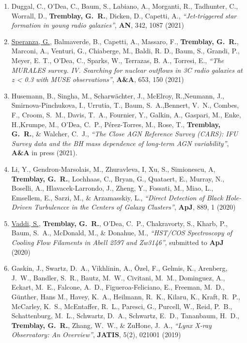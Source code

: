 \documentclass[11pt]{article}
\begin{document}
\begin{enumerate}%


\item Duggal, C., O'Dea, C., Baum, S., Labiano, A., Morganti, R., Tadhunter, C., Worrall, D., \textbf{Tremblay, G.~R.}, Dicken, D., Capetti, A., \textit{``Jet-triggered star formation in young radio galaxies''}, \textbf{AN}, 342, 1087 (2021)

\item \uline{Speranza, G.}, Balmaverde, B., Capetti, A., Massaro, F., \textbf{Tremblay, G.~R.}, Marconi, A., Venturi, G., Chiaberge, M., Baldi, R. D., Baum, S., Grandi, P., Meyer, E. T., O'Dea, C., Sparks, W., Terrazas, B. A., Torresi, E., \textit{``The MURALES survey. IV. Searching for nuclear outflows in 3C radio galaxies at z < 0.3 with MUSE observations''}, \textbf{A\&A}, 653, 150 (2021)

\item Husemann, B., Singha, M., Scharw\"{a}chter, J., McElroy, R.,Neumann, J.,
Smirnova-Pinchukova, I., Urrutia, T., Baum, S.~A.,Bennert, V.~N., Combes, F., Croom, S.~M.,
Davis, T.~A., Fournier, Y., Galkin, A., Gaspari, M., Enke, H.,Krumpe, M., O'Dea, C.~P.,
P\'{e}rez-Torres, M., Rose, T., \textbf{Tremblay, G.~R.}, \& Walcher, C.~J., \textit{``The Close AGN Reference Survey (CARS): IFU Survey data and the BH mass dependence of long-term AGN variability''},
\textbf{A\&A} in press (2021).

\item Li, Y., Gendron-Marsolais, M., Zhuravleva, I, Xu, S.,
Simionescu, A, \textbf{Tremblay, G.~R.}, Lochhaas, C., Bryan, G.,
Quataert, E., Murray, N., Boselli, A., Hlavacek-Larrondo, J.,
Zheng, Y., Fossati, M., Miao, L., Emsellem, E., Sarzi, M.,
\& Arzamasskiy, L., \textit{``Direct Detection of Black Hole-Driven Turbulencce
in the Centers of Galaxy Clusters''}, \textbf{ApJ}, 889, 1 (2020)

\item \uline{Vaddi, S.}, \textbf{Tremblay, G.~R.}, O'Dea, C.~P.,
Chakravorty, S., Kharb, P., Baum, S.~A., McDonald, M., \& Donahue, M.,
\textit{``HST/COS Spectroscopy of Cooling Flow Filaments in Abell 2597 and Zw3146''},
submitted to \textbf{ApJ} (2020)


\item Gaskin, J., Swartz, D.~A., Vikhlinin, A., \"{O}zel, F.,
Gelmis, K., Arenberg, J.~W., Bandler, S.~R., Bautz, M.~W., Civitani, M.~M.,
Dominguez, A., Eckart, M.~E., Falcone, A.~D., Figueroa-Feliciano, E.,
Freeman, M.~D., G\"{u}nther, Hans M., Havey, K.~A., Heilmann, R.~K.,
Kilaru, K., Kraft, R.~P., McCarley, K.~S., McEntaffer, R.~L.,
Paresci, G., Purcell, W., Reid, P.~B., Schattenburg, M.~L.,
Schwartz, D.~A., Schwartz, E.~D., Tananbaum, H.~D.,
\textbf{Tremblay, G.~R.}, Zhang, W.~W., \& ZuHone, J.~A.,
\textit{``Lynx X-ray Observatory: An Overview''}, \textbf{JATIS}, 5(2), 021001 (2019)


\end{enumerate}
\end{document}
